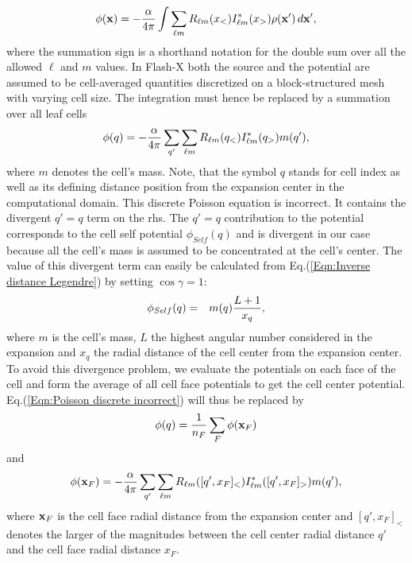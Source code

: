 \begin{equation}
\label{Eqn:Poisson solid harmonics}
\phi({\bf x}) = -{\alpha\over 4\pi}
\int \sum_{\ell m}R_{\ell m}(x_<)I_{\ell m}^*(x_>)\rho({\bf x}')\,d{\bf x}',
\end{equation}
where the summation sign is a shorthand notation for the double sum over all the
allowed $\ell$ and $m$ values. In Flash-X both the source and the potential are
assumed to be cell-averaged quantities discretized on a block-structured mesh with
varying cell size. The integration must hence be replaced by a summation over all 
leaf cells
\begin{equation}
\label{Eqn:Poisson discrete incorrect}
\phi(q) = -{\alpha\over 4\pi}
\sum_{q'} \sum_{\ell m}R_{\ell m}(q_<)I_{\ell m}^*(q_>)m(q'),
\end{equation}
where $m$ denotes the cell's mass. Note, that the symbol $q$ stands for cell index as well
as its defining distance position from the expansion center in the computational domain.
This discrete Poisson equation is incorrect. It contains the divergent $q'=q$ term on
the rhs. The $q'=q$ contribution to the potential corresponds to the cell self potential
$\phi_{Self}(q)$ and is divergent in our case because all the cell's mass is assumed to be
concentrated at the cell's center. The value of this divergent term can easily be calculated
from Eq.(\ref{Eqn:Inverse distance Legendre}) by setting $\cos\gamma = 1$:
\begin{eqnarray}
\phi_{Self}(q) & = &  m(q){L+1\over x_q},
\end{eqnarray}
where $m$ is the cell's mass, $L$ the highest angular number considered in the expansion
and $x_q$ the radial distance of the cell center from the expansion center. To avoid this divergence
problem, we evaluate the potentials on each face of the cell and form the average of all
cell face potentials to get the cell center potential. Eq.(\ref{Eqn:Poisson discrete incorrect})
will thus be replaced by
\begin{equation}
\phi(q) = {1\over n_F} \sum_{F} \phi({\bf x}_F)
\end{equation}
and
\begin{equation}
\label{Eqn:Poisson discrete correct}
\phi({\bf x}_F) = -{\alpha\over 4\pi}
\sum_{q'} \sum_{\ell m}R_{\ell m}([q',x_F]_<)I_{\ell m}^*([q',x_F]_>)m(q'),
\end{equation}
where ${\bf x}_F$ is the cell face radial distance from the expansion center and $[q',x_F]_<$ denotes the
larger of the magnitudes between the cell center radial distance $q'$ and the cell face radial distance $x_F$.
